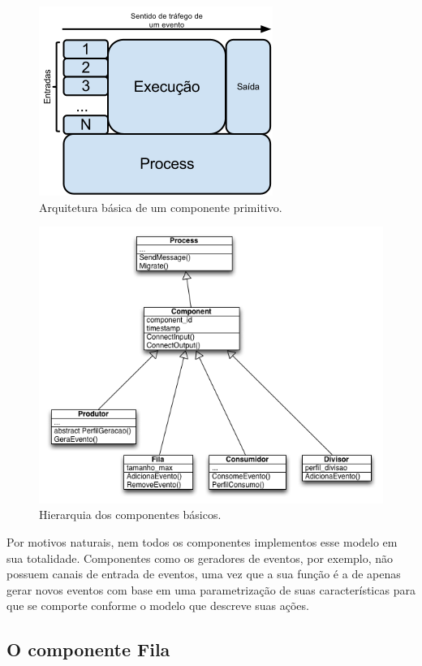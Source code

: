 \begin{figure}
  \centerline{\includegraphics{basic_component.png}}
  \caption{Arquitetura básica de um componente primitivo.}
\label{fig:basic_component}
\end{figure}

\begin{figure}
  \centerline{\includegraphics{uml_componentes.png}}
  \caption{Hierarquia dos componentes básicos.}
\label{fig:uml_components}
\end{figure}


Por motivos naturais, nem todos os componentes implementos esse modelo em sua totalidade. Componentes como os geradores de eventos, por exemplo, não possuem canais de entrada de eventos, uma vez que a sua função é a de apenas gerar novos eventos com base em uma parametrização de suas características para que se comporte conforme o modelo que descreve suas ações. 

\subsection{O componente Fila}

